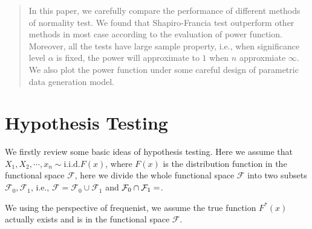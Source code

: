 \documentclass[twoside]{article}
\begin{document}
%

%


\begin{abstract}
  In this paper, we carefully compare the performance of different methods of normality test. We found that Shapiro-Francia test outperform other methods in most case according to the evaluation of power function. Moreover, all the tests have large sample property, i.e., when significance level $\alpha$ is fixed, the power will approximate to $1$ when $n$ approxmiate $\infty$. We also plot the power function under some careful design of parametric data generation model.
\end{abstract}

\section{Hypothesis Testing}

\label{hyt}

We firstly review some basic ideas of hypothesis testing. Here we assume that $X_1, X_2, \cdots, x_n \sim \mathrm{i.i.d.} F(x)$, where $F(x)$ is the distribution function in the functional space $\mathcal{F}$, here we divide the whole functional space $\mathcal{F}$ into two subsets $\mathcal{F}_0, \mathcal{F}_1$, i.e., $\mathcal{F} = \mathcal{F}_0 \cup \mathcal{F}_1$ and $\mathcal{F}_0 \cap \mathcal{F}_1 = \empty$.

We using the perspective of frequenist, we assume the true function $F^*(x)$ actually exists and is in the functional space $\mathcal{F}$.
\end{document}
